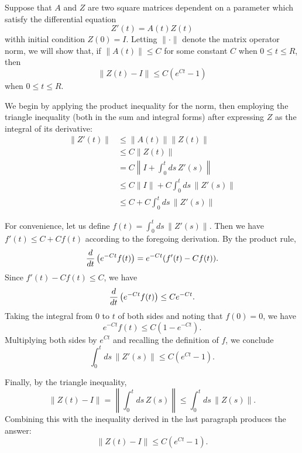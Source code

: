 \documentclass[12pt]{article}
\begin{document}
Suppose that $A$ and $Z$ are two square matrices dependent
on a parameter which satisfy the differential equation
\[
 Z'(t) = A(t) Z(t)
\]
withh initial condition $Z(0) = I$.
Letting $\| \cdot \|$ denote the matrix operator norm, we
will show that, if $\| A(t) \| \le C$ for some constant
$C$ when $0 \le t \le R$, then
\[
 \| Z(t) - I \| \le C \left( e^{Ct} - 1 \right)
\]
when $0 \le t \le R$.

We begin by applying the product inequality for the norm,
then employing the triangle inequality (both in the sum and
integral forms) after expressing
$Z$ as the integral of its derivative:
\begin{align*}
 \| Z'(t) \| &\le \| A(t) \| \| Z(t) \| \\
  & \le C \| Z(t) \| \\
  & = C \left\| I + \int_0^t ds \, Z'(s) \right\| \\
  &\le C \| I \| + C \int_0^t ds \, \| Z' (s) \| \\
  &\le C + C \int_0^t ds \, \| Z' (s) \|
\end{align*}

For convenience, let us define $f(t) = \int_0^t ds \, \| Z' (s) \|$.
Then we have $f'(t) \le C + C f(t)$ according to the 
foregoing derivation.  By the product rule,
\[
 {d \over dt} \left( e^{-Ct} f(t) \right) =
  e^{-Ct} (f'(t) - C f(t)) .
\]
Since $f'(t) - C f(t) \le C$, we have
\[
 {d \over dt} \left( e^{-Ct} f(t) \right) \le
  C e^{-Ct} .
\]
Taking the integral from $0$ to $t$ of both sides and 
noting that $f(0) = 0$, we have
\[
 e^{-Ct} f(t) \le C \left( 1 - e^{-Ct} \right) .
\]
Multiplying both sides by $e^{Ct}$ and recalling the
definition of $f$, we conclude
\[
 \int_0^t ds \, \| Z'(s) \| 
   \le C \left( e^{Ct} - 1 \right) .
\]

Finally, by the triangle inequality,
\[
 \| Z(t) - I \| 
   = \left\| \int_0^t ds \, Z(s) \right\|
   \le \int_0^t ds \, \| Z(s) \| .
\]
Combining this with the inequality derived in the
last paragraph produces the answer:
\[
 \| Z(t) - I \| \le C \left( e^{Ct} - 1 \right) .
\]
\end{document}
